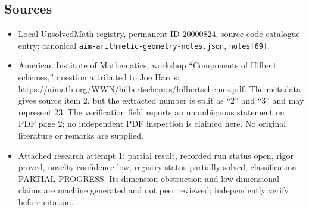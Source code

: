 \documentclass[11pt]{article}
\begin{document}
\subsection{Sources}
\begin{itemize}
\item Local UnsolvedMath registry, permanent ID $20000824$, source code catalogue entry; canonical \texttt{aim-arithmetic-geometry-notes.json}, \texttt{notes[69]}.
\item American Institute of Mathematics, workshop ``Components of Hilbert schemes,'' question attributed to Joe Harris: \url{https://aimath.org/WWN/hilbertschemes/hilbertschemes.pdf}. The metadata gives source item 2, but the extracted number is split as ``2'' and ``3'' and may represent 23. The verification field reports an unambiguous statement on PDF page 2; no independent PDF inspection is claimed here. No original literature or remarks are supplied.
\item Attached research attempt 1: partial result, recorded run status open, rigor proved, novelty confidence low; registry status partially solved, classification PARTIAL-PROGRESS. Its dimension-obstruction and low-dimensional claims are machine generated and not peer reviewed; independently verify before citation.
\end{itemize}
\end{document}
